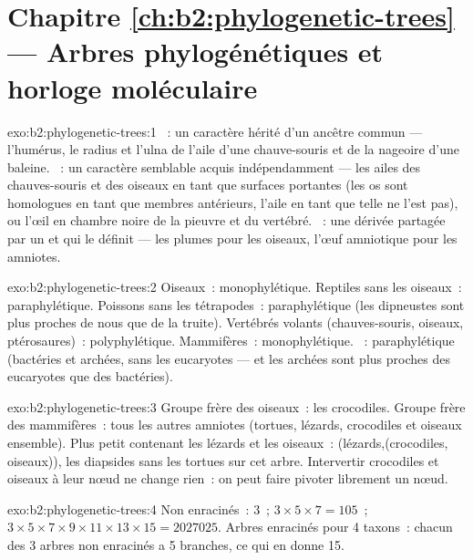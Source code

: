 \section*{Chapitre \ref{ch:b2:phylogenetic-trees} --- Arbres phylogénétiques et horloge moléculaire}

\begin{solution}{exo:b2:phylogenetic-trees:1}
~: un caractère hérité d'un ancêtre commun --- l'humérus, le
radius et l'ulna de l'aile d'une chauve-souris et de la nageoire d'une
baleine. ~: un caractère semblable acquis indépendamment --- les
ailes des chauves-souris et des oiseaux en tant que surfaces portantes
(les os sont homologues en tant que membres antérieurs, l'aile en tant
que telle ne l'est pas), ou l'œil en chambre noire de la pieuvre et du
vertébré. ~: une  dérivée partagée par un  et
qui le définit --- les plumes pour les oiseaux, l'œuf amniotique pour les
amniotes.
\end{solution}

\begin{solution}{exo:b2:phylogenetic-trees:2}
Oiseaux~: monophylétique. Reptiles sans les oiseaux~: paraphylétique.
Poissons sans les tétrapodes~: paraphylétique (les dipneustes sont plus
proches de nous que de la truite). Vertébrés volants (chauves-souris,
oiseaux, ptérosaures)~: polyphylétique. Mammifères~: monophylétique.
~: paraphylétique (bactéries et archées, sans les eucaryotes
--- et les archées sont plus proches des eucaryotes que des bactéries).
\end{solution}

\begin{solution}{exo:b2:phylogenetic-trees:3}
Groupe frère des oiseaux~: les crocodiles. Groupe frère des mammifères~:
tous les autres amniotes (tortues, lézards, crocodiles et oiseaux
ensemble). Plus petit  contenant les lézards et les oiseaux~:
(lézards,(crocodiles, oiseaux)), les diapsides sans les tortues sur cet
arbre. Intervertir crocodiles et oiseaux à leur nœud ne change rien~: on
peut faire pivoter librement un nœud.
\end{solution}

\begin{solution}{exo:b2:phylogenetic-trees:4}
Non enracinés~: $3$~; $3\times 5\times 7 = 105$~; $3\times 5\times
7\times 9\times 11\times 13\times 15 = \num{2027025}$. Arbres enracinés
pour 4 taxons~: chacun des 3 arbres non enracinés a 5 branches, ce qui
en donne 15.
\end{solution}

